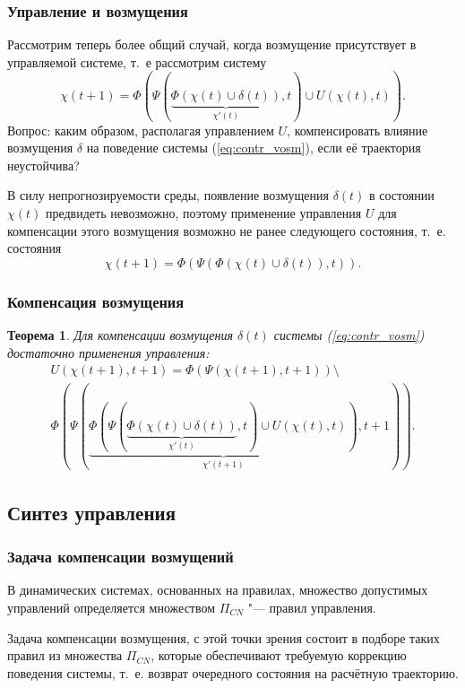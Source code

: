 \documentclass[default]{beamer}
\newtheorem{Theorem}{Теорема}
\begin{document}
	\begin{frame}
		\frametitle{Управление и возмущения}
		
		Рассмотрим теперь более общий случай, когда возмущение присутствует в управляемой системе, т.~е рассмотрим систему
		\begin{equation}\label{eq:contr_vosm}
			\chi(t+1) =\Phi(\Psi(\underbrace{\Phi(\chi(t)\cup\delta(t))}_{\chi'(t)},t)\cup U(\chi(t),t)).
		\end{equation}
		Вопрос: каким образом, располагая управлением $U$, компенсировать влияние возмущения $\delta$ на поведение системы (\ref{eq:contr_vosm}), если её траектория неустойчива?
		\par\bigskip
		В силу непрогнозируемости среды, появление возмущения $\delta(t)$ в состоянии $\chi(t)$ предвидеть невозможно, поэтому применение управления $U$ для компенсации этого возмущения  возможно не ранее следующего состояния, т.~е.  состояния 
		\begin{equation}
			\chi(t+1)=\Phi(\Psi(\Phi(\chi(t)\cup\delta(t)),t)).
		\end{equation}
	\end{frame}

	\begin{frame}
		\frametitle{Компенсация возмущения}
		
		\begin{Theorem}\label{th:compens}
			Для компенсации возмущения $\delta(t)$ системы (\ref{eq:contr_vosm}) достаточно применения управления:
			\begin{eqnarray}
				U(\chi(t+1),t+1)=\Phi(\Psi(\chi(t+1),t+1))\setminus\nonumber\\
				\Phi(\Psi(\underbrace{\Phi(\Psi(\underbrace{\Phi(\chi(t)\cup\delta(t))}_{\chi'(t)},t)\cup U(\chi(t),t))}_{\chi'(t+1)},t+1)).
			\end{eqnarray}
		\end{Theorem}
	\end{frame}

	\subsection{Синтез управления}

	\begin{frame}
		\frametitle{Задача компенсации возмущений}
		
		В динамических системах, основанных на правилах, множество допустимых управлений определяется множеством $\Pi_{CN}$ "--- правил управления. 
		\par\bigskip
		Задача компенсации возмущения, с этой точки зрения состоит в подборе таких правил из множества  $\Pi_{CN}$, которые обеспечивают требуемую коррекцию поведения системы, т.~е. возврат очередного состояния на расчётную траекторию.
	\end{frame}
\end{document}
